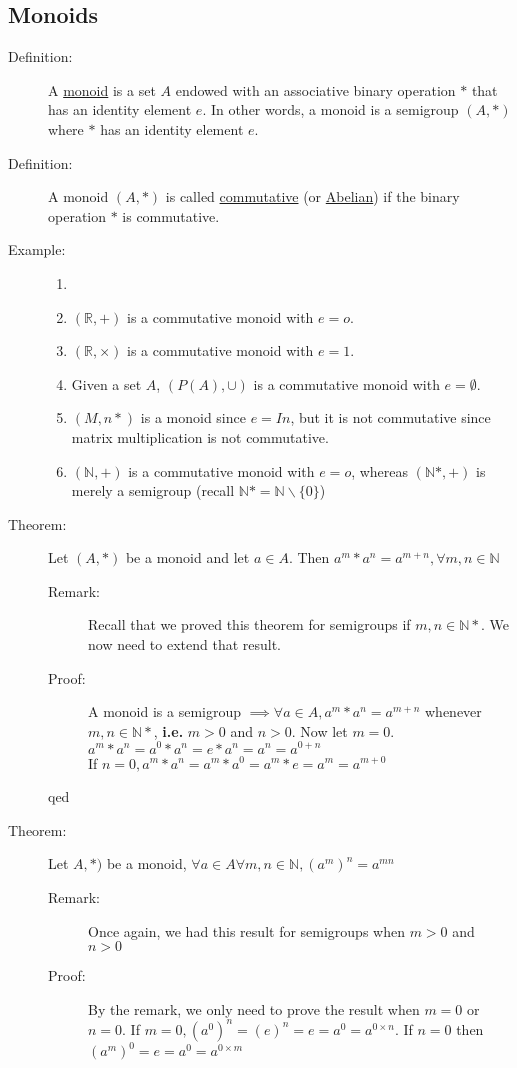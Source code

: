 \documentclass[10pt]{article}
\begin{document}
	\subsection{Monoids}
	\begin{description}
		\item[Definition:] A \underline{monoid} is a set $A$ endowed with an associative binary operation $*$ that has an identity element $e$. In other words, a monoid is a semigroup $(A, *)$ where $*$ has an identity element $e$.
		\item[Definition:] A monoid $(A, *)$ is called \underline{commutative} (or \underline{Abelian}) if the binary operation $*$ is commutative.
		\item[Example:]
		\begin{enumerate}
			\item[]
			\item $(\mathbb{R}, +)$ is a commutative monoid with $e=o$.
			\item $(\mathbb{R}, \times)$ is a commutative monoid with $e=1$.
			\item Given a set $A$, $(P(A), \cup)$ is a commutative monoid with $e = \emptyset$.
			\item $(M,n *)$ is a monoid since $e=In$, but it is not commutative since matrix multiplication is not commutative.
			\item $(\mathbb{N}, +)$ is a commutative monoid with $e=o$, whereas $(\mathbb{N}*, +)$ is merely a semigroup (recall $\mathbb{N}* = \mathbb{N} \backslash\{0\}$)
		\end{enumerate}
		\item[Theorem:] Let $(A, *)$ be a monoid and let $a \in A$. Then $a^m * a^n = a^{m+n}, \forall m, n \in \mathbb{N}$
		\begin{description}
			\item[Remark:] Recall that we proved this theorem for semigroups if $m, n \in \mathbb{N}*$. We now need to extend that result.
			\item[Proof:] A monoid is a semigroup $\implies \forall a \in A, a^m * a^n = a^{m+n}$ whenever $m, n \in \mathbb{N}*$, \textbf{i.e.} $m > 0$ and $n > 0$. Now let $m = 0$. $a^m * a^n = a^0 * a^n = e * a^n = a^n = a^{0+n}$ \\
			If $n=0, a^m * a^n = a^m * a^0 = a^m* e = a^m = a^{m+0}$
			\item[qed]
		\end{description}
		\item[Theorem:] Let $A, *)$ be a monoid, $\forall a \in A \forall m, n \in \mathbb{N}, (a^m)^n = a^{mn}$
		\begin{description}
			\item[Remark:] Once again, we had this result for semigroups when $m>0$ and $n > 0$
			\item[Proof:] By the remark, we only need to prove the result when $m=0$ or $n=0$. If $m=0, (a^0)^n = (e)^n = e = a^0 = a^{0\times n}$. If $n=0$ then $(a^m)^0 = e = a^0 = a^{0 \times m}$
		\end{description}
	\end{description}
	
\end{document}
